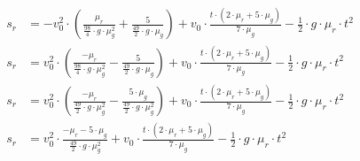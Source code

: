 \begin{align}
    s_r &= - v_0^2 \cdot (\frac{\mu_r}{\frac{98}{4} \cdot g \cdot \mu_g^2} + \frac{5}{\frac{49}{2} \cdot g \cdot \mu_g}) + v_0 \cdot \frac{t \cdot (2 \cdot \mu_r + 5 \cdot \mu_g)}{7 \cdot \mu_g} - \frac{1}{2} \cdot g \cdot \mu_r \cdot t^2\\
    s_r &= v_0^2 \cdot (\frac{-\mu_r}{\frac{98}{4} \cdot g \cdot \mu_g^2} - \frac{5}{\frac{49}{2} \cdot g \cdot \mu_g}) + v_0 \cdot \frac{t \cdot (2 \cdot \mu_r + 5 \cdot \mu_g)}{7 \cdot \mu_g} - \frac{1}{2} \cdot g \cdot \mu_r \cdot t^2\\
    s_r &= v_0^2 \cdot (\frac{-\mu_r}{\frac{49}{2} \cdot g \cdot \mu_g^2} - \frac{5 \cdot \mu_g}{\frac{49}{2} \cdot g \cdot \mu_g^2}) + v_0 \cdot \frac{t \cdot (2 \cdot \mu_r + 5 \cdot \mu_g)}{7 \cdot \mu_g} - \frac{1}{2} \cdot g \cdot \mu_r \cdot t^2\\
    s_r &= v_0^2 \cdot \frac{-\mu_r - 5 \cdot \mu_g}{\frac{49}{2} \cdot g \cdot \mu_g^2} + v_0 \cdot \frac{t \cdot (2 \cdot \mu_r + 5 \cdot \mu_g)}{7 \cdot \mu_g} - \frac{1}{2} \cdot g \cdot \mu_r \cdot t^2
\end{align}

